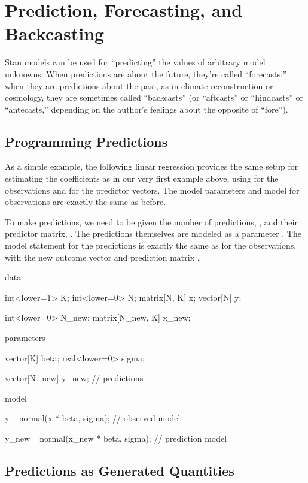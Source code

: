 \section{Prediction, Forecasting, and Backcasting}

Stan models can be used for ``predicting'' the values of arbitrary
model unknowns.  When predictions are about the future, they're called
``forecasts;'' when they are predictions about the past, as in climate
reconstruction or cosmology, they are sometimes called ``backcasts''
(or ``aftcasts'' or ``hindcasts'' or ``antecasts,'' depending on the
author's feelings about the opposite of ``fore'').

\subsection{Programming Predictions}

As a simple example, the following linear regression provides the same
setup for estimating the coefficients  as in our very first
example above, using  for the  observations and
 for the  predictor vectors.  The model parameters and
model for observations are exactly the same as before.

To make predictions, we need to be given the number of predictions,
, and their predictor matrix, .  The
predictions themselves are modeled as a parameter .  The
model statement for the predictions is exactly the same as for the
observations, with the new outcome vector  and prediction
matrix .
%
\begin{stancode}
data {
  int<lower=1> K;
  int<lower=0> N;
  matrix[N, K] x;       
  vector[N] y;     

  int<lower=0> N_new;
  matrix[N_new, K] x_new; 
}
parameters {
  vector[K] beta;
  real<lower=0> sigma;

  vector[N_new] y_new;                  // predictions
}
model {
  y ~ normal(x * beta, sigma);          // observed model

  y_new ~ normal(x_new * beta, sigma);  // prediction model
}
\end{stancode}


\subsection{Predictions as Generated Quantities}

